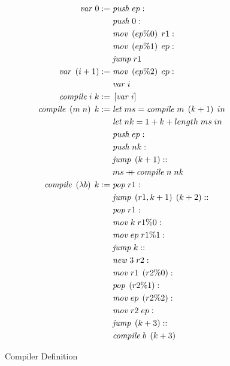 \begin{figure}
\begin{align*}
\mathit{var} \; 0 :=  \;
  &\mathit{push} \; ep : \\
  &\mathit{push} \; 0 : \\
  &\mathit{mov} \; \left(ep\%0\right) \; r1 : \\
  &\mathit{mov} \; \left(ep\%1\right) \; ep : \\
  &\mathit{jump} \; r1 \\
\mathit{var} \; \left(i+1\right) := \;
  &\mathit{mov} \; \left(ep\%2\right) \; ep : \\
  &\mathit{var} \; i \\
\mathit{compile} \; i \; k := \; & \left[\mathit{var} \; i\right] \\
\mathit{compile} \; \left( m \; n \right) \; k := \;
  &\mathit{let} \; ms = \mathit{compile} \; m \; \left(k+1\right) \; in \\
  &\mathit{let} \; nk = 1+k+length \; ms \; in \\
  &\mathit{push} \; ep :  \\
  &\mathit{push} \; nk : \\
  &\mathit{jump} \; \left(k+1\right) :: \\
  &ms +\!\!\!\!+\, \mathit{compile} \; n \; nk \\
\mathit{compile} \; \left(\lambda b\right) \; k := \;
  &\mathit{pop} \; r1 : \\
  &\mathit{jump} \; \left(r1, k+1 \right) \; \left(k+2\right) :: \\
  &\mathit{pop} \; r1 : \\
  &\mathit{mov} \; k \; r1\%0 : \\
  &\mathit{mov} \; ep \; r1\%1 : \\
  &\mathit{jump} \; k :: \\
  &\mathit{new} \; 3 \; r2 : \\
  &\mathit{mov} \; r1 \; \left(r2\%0\right) : \\
  &\mathit{pop} \; \left(r2\%1\right) : \\
  &\mathit{mov} \; ep \; \left(r2\%2\right) : \\
  &\mathit{mov} \; r2 \; ep : \\
  &\mathit{jump} \; \left(k+3\right) :: \\
  &\mathit{compile} \; b \; \left(k+3\right)
\end{align*}
\caption{Compiler Definition}
\label{fig:compiler}
\end{figure}

